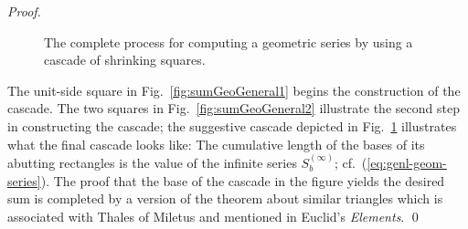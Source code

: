 \begin{proof}
\begin{figure}[ht]
\begin{center}
\caption{The complete process for computing a geometric series by using a cascade of shrinking squares.}
       \label{fig:sumGeoGeneral3}
\end{center}
\end{figure}
The unit-side square in Fig.~\ref{fig:sumGeoGeneral1} begins the construction of the cascade.  The two squares in Fig.~\ref{fig:sumGeoGeneral2} illustrate the second step in constructing the cascade; the suggestive cascade depicted in Fig.~\ref{fig:sumGeoGeneral3} illustrates what the final cascade looks like: The cumulative length of the bases of its abutting rectangles is the value of the infinite series $S_b^{(\infty)}$; cf.~(\ref{eq:genl-geom-series}).  The proof that the base of the cascade in the figure yields the desired sum is completed by a version of the theorem about similar triangles which is associated with Thales of Miletus and mentioned in Euclid's {\it Elements}. \qed
\end{proof}
 

\medskip

\noindent {}

